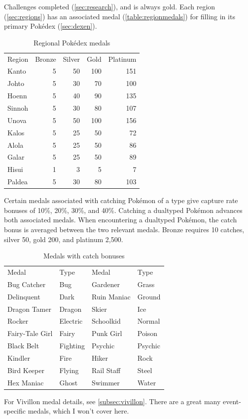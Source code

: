   Challenges completed (\autoref{sec:research}), and is always gold.
Each region (\autoref{sec:regions}) has an associated medal (\autoref{table:regionmedals}) for filling
  in its primary Pokédex (\autoref{sec:dexen}).
\begin{table}
\centering
\begin{tabular}{lrrrr}
  Region & Bronze & Silver & Gold & Platinum\\
  \Midrule
  Kanto & 5 & 50 & 100 & 151\\
  Johto & 5 & 30 & 70 & 100\\
  Hoenn & 5 & 40 & 90 & 135\\
  Sinnoh & 5 & 30 & 80 & 107\\
  Unova & 5 & 50 & 100 & 156\\
  Kalos & 5 & 25 & 50 & 72\\
  Alola & 5 & 25 & 50 & 86\\
  Galar & 5 & 25 & 50 & 89\\
  Hisui & 1 & 3 & 5 & 7\\
  Paldea & 5 & 30 & 80 & 103\\
\end{tabular}
\caption{Regional Pokédex medals}
\label{table:regionmedals}
\end{table}
Certain medals associated with catching Pokémon of a type give capture rate bonuses of 10\%, 20\%, 30\%, and 40\%.
Catching a dualtyped Pokémon advances both associated medals.
When encountering a dualtyped Pokémon, the catch bonus is averaged between the two relevant medals.
Bronze requires 10 catches, silver 50, gold 200, and platinum 2,500.
\begin{table}
\centering
\begin{tabular}{ll|ll}
  Medal & Type & Medal & Type\\
  \Midrule
  Bug Catcher & Bug & Gardener & Grass\\
  Delinquent & Dark & Ruin Maniac & Ground\\
  Dragon Tamer & Dragon & Skier & Ice\\
  Rocker & Electric & Schoolkid & Normal\\
  Fairy-Tale Girl & Fairy & Punk Girl & Poison\\
  Black Belt & Fighting & Psychic & Psychic\\
  Kindler & Fire & Hiker & Rock\\
  Bird Keeper & Flying & Rail Staff & Steel\\
  Hex Maniac & Ghost & Swimmer & Water\\
\end{tabular}
\caption{Medals with catch bonuses}
\label{table:medalcatch}
\end{table}
For Vivillon medal details, see \autoref{subsec:vivillon}.
There are a great many event-specific medals, which I won't cover here.

